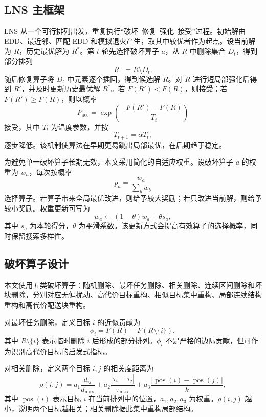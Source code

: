 \documentclass[11pt,a4paper]{ctexart}
\begin{document}
\subsection{LNS 主框架}

\indent LNS 从一个可行排列出发，重复执行“破坏--修复--强化--接受”过程。初始解由 EDD、最近邻、匹配 EDD 和模拟退火产生，取其中较优者作为起点。设当前解为 $R$，历史最优解为 $R^*$。第 $t$ 轮先选择破坏算子 $a$，从 $R$ 中删除集合 $D_t$，得到部分排列
\[
R^{-}=R\setminus D_t.
\]
\indent 随后修复算子将 $D_t$ 中元素逐个插回，得到候选解 $\tilde R$。对 $\tilde R$ 进行短局部强化后得到 $R'$，并及时更新历史最优解 $R^*$。若 $F(R')<F(R)$，则接受；若 $F(R')\ge F(R)$，则以概率
\begin{equation}
P_{\mathrm{acc}}=\exp\left(-\frac{F(R')-F(R)}{T_t}\right)\label{eq:accept}
\end{equation}
\indent 接受，其中 $T_t$ 为温度参数，并按
\begin{equation}
T_{t+1}=\alpha T_t,
\end{equation}
\indent 逐步降低。该机制使算法在早期更易跳出局部最优，在后期趋于稳定。

\indent 为避免单一破坏算子长期无效，本文采用简化的自适应权重。设破坏算子 $a$ 的权重为 $w_a$，每次按概率
\[
p_a=\frac{w_a}{\sum_b w_b}
\]
\indent 选择算子。若算子带来全局最优改进，则给予较大奖励；若只改进当前解，则给予较小奖励。权重更新可写为
\begin{equation}
w_a\leftarrow (1-\theta)w_a+\theta s_a,\label{eq:weight}
\end{equation}
\indent 其中 $s_a$ 为本轮得分，$\theta$ 为平滑系数。该更新方式会提高有效算子的选择概率，同时保留搜索多样性。

\subsection{破坏算子设计}

\indent 本文使用五类破坏算子：随机删除、最坏任务删除、相关删除、连续区间删除和坏块删除，分别对应无偏扰动、高代价目标重构、相似目标集中重构、局部连续结构重构和高代价配送块重构。

\indent 对最坏任务删除，定义目标 $i$ 的近似贡献为
\begin{equation}
\phi_i=F(R)-F(R\setminus\{i\}),\label{eq:badcost}
\end{equation}
\indent 其中 $R\setminus\{i\}$ 表示临时删除 $i$ 后形成的部分排列。$\phi_i$ 不是严格的边际贡献，但可作为识别高代价目标的启发式指标。

\indent 对相关删除，定义两个目标 $i,j$ 的相关度距离为
\begin{equation}
\rho(i,j)=a_1\frac{d_{ij}}{d_{\max}}+a_2\frac{|\tau_i-\tau_j|}{\tau_{\max}}+a_3\frac{|\operatorname{pos}(i)-\operatorname{pos}(j)|}{k},\label{eq:related}
\end{equation}
\indent 其中 $\operatorname{pos}(i)$ 表示目标 $i$ 在当前排列中的位置，$a_1,a_2,a_3$ 为权重。$\rho(i,j)$ 越小，说明两个目标越相关；相关删除据此集中重构局部结构。
\end{document}

